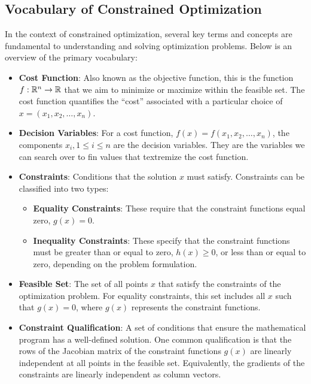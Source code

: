 \subsection{Vocabulary of Constrained Optimization}

In the context of constrained optimization, several key terms and concepts are fundamental to understanding and solving optimization problems. Below is an overview of the primary vocabulary:

\begin{itemize}
   
    \item \textbf{Cost Function}: Also known as the objective function, this is the function  $f:\mathbb R^n \to \mathbb R$ that we aim to minimize or maximize within the feasible set. The cost function quantifies the ``cost'' associated with a particular choice of \(x=(x_1, x_2, \ldots, x_n)\).

       
    \item \textbf{Decision Variables}: For a cost function, $f(x) = f(x_1, x_2, \ldots, x_n)$, the components $x_i, 1 \le i \le n$ are the decision variables. They are the variables we can search over to fin values that textremize the cost function.
    
    \item \textbf{Constraints}: Conditions that the solution \(x\) must satisfy. Constraints can be classified into two types:
    \begin{itemize}
        \item \textbf{Equality Constraints}: These require that the constraint functions equal zero, \(g(x) = 0\).
        \item \textbf{Inequality Constraints}: These specify that the constraint functions must be greater than or equal to zero, \(h(x) \geq 0\), or less than or equal to zero, depending on the problem formulation.
    \end{itemize}

        \item \textbf{Feasible Set}: The set of all points \(x\) that satisfy the constraints of the optimization problem. For equality constraints, this set includes all \(x\) such that \(g(x) = 0\), where \(g(x)\) represents the constraint functions.
    
    \item \textbf{Constraint Qualification}: A set of conditions that ensure the mathematical program has a well-defined solution. One common qualification is that the rows of the Jacobian matrix of the constraint functions \(g(x)\) are linearly independent at all points in the feasible set. Equivalently, the gradients of the constraints are linearly independent as column vectors. 
    

\end{itemize}
